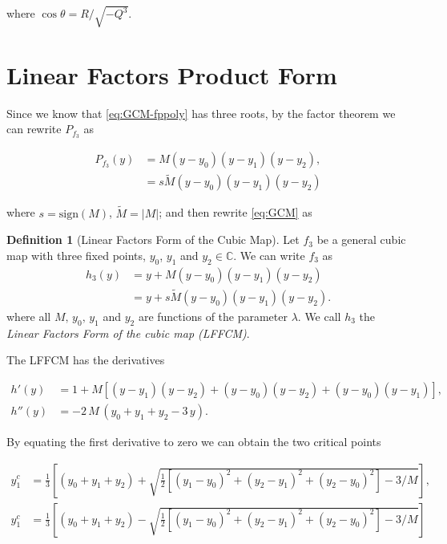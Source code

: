 \documentclass[10pt,twoside,titlepage]{book}
\numberwithin{equation}{chapter}
\numberwithin{figure}{chapter}
\numberwithin{table}{chapter}
\theoremstyle{plain}%
\theoremstyle{definition}
\newtheorem{defn}{Definition}[chapter]
\theoremstyle{remark}
\begin{document}
where $\cos\theta=R/\sqrt{-Q^3}$.

\section{Linear Factors Product Form}
\label{sec:LinearFactorsCM}

Since we know that \eqref{eq:GCM-fppoly} has three roots, by the factor theorem we can rewrite $P_{f_3}$ as

\begin{equation}
	\begin{aligned}
		P_{f_3}(y) 	&= M(y-y_0)(y-y_1)(y-y_2),\\
		&= s\tilde{M}(y-y_0)(y-y_1)(y-y_2)
	\end{aligned}
\end{equation}

where $s=\mathrm{sign}(M)$, $\tilde{M}=|M|$; and then rewrite \eqref{eq:GCM} as

\begin{defn}[Linear Factors Form of the Cubic Map]
	\label{def:LFFCM}
	Let $f_3$ be a general cubic map with three fixed points, $y_0$, $y_1$ and $y_2\in\mathbb{C}$. We can write $f_3$ as
	\begin{equation}
		\label{eq:LinearFactorsCM}
		\begin{aligned}
			h_3(y)	&= y + M(y-y_0)(y-y_1)(y-y_2)\\
			&= y + s\tilde{M}(y-y_0)(y-y_1)(y-y_2).
		\end{aligned}
	\end{equation}
	where all $M,\,y_0,\,y_1$ and $y_2$ are functions of the parameter $\lambda$. We call $h_3$ the \emph{Linear Factors Form of the cubic map (LFFCM)}.
\end{defn}

The LFFCM has the derivatives

\begin{equation}
	\begin{aligned}
		h'(y) &= 1 + M \left[ (y-y_1)(y-y_2) + (y-y_0)(y-y_2) + (y-y_0)(y-y_1) \right],\\
		h''(y) &= -2\,M\,\left( y_0 + y_1 + y_2 -3\,y\right).
	\end{aligned}
\end{equation}

By equating the first derivative to zero we can obtain the two critical points

\begin{equation}
	\begin{aligned}
		y_1^c &=\frac{1}{3}\left[(y_0+y_1+y_2)+\sqrt{\frac{1}{2}\left[(y_1-y_0)^2+(y_2-y_1)^2+(y_2-y_0)^2\right]-3/M}\right],\\
		y_1^c &=\frac{1}{3}\left[(y_0+y_1+y_2)-\sqrt{\frac{1}{2}\left[(y_1-y_0)^2+(y_2-y_1)^2+(y_2-y_0)^2\right]-3/M}\right]
	\end{aligned}
\end{equation}
\end{document}
